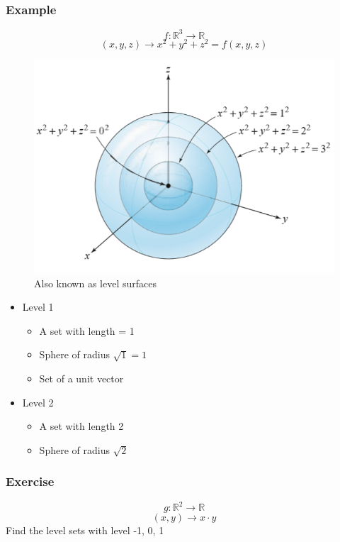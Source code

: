 \documentclass{article}
\begin{document}
\subsubsection*{Example}
\[f:\mathbb{R}^3\rightarrow\mathbb{R}\]
\[(x,y,z)\rightarrow x^2+y^2+z^2=f(x,y,z)\]
\begin{figure}[h!]
    \centering
    \includegraphics[scale=.3]{levelSets.png}
    \caption{Also known as level surfaces}
    \label{}
\end{figure}

\begin{itemize}
    \item Level 1
    \begin{itemize}
        \item A set with length = 1
        \item Sphere of radius $\sqrt{1}=1$
        \item Set of a unit vector
    \end{itemize}
    \item Level 2
    \begin{itemize}
        \item A set with length 2
        \item Sphere of radius $\sqrt{2}$
    \end{itemize}
\end{itemize}

\subsubsection*{Exercise}
\[g: \mathbb{R}^2 \rightarrow\mathbb{R}\]
\[(x,y)\rightarrow x\cdot y\]
Find the level sets with level -1, 0, 1
\end{document}
